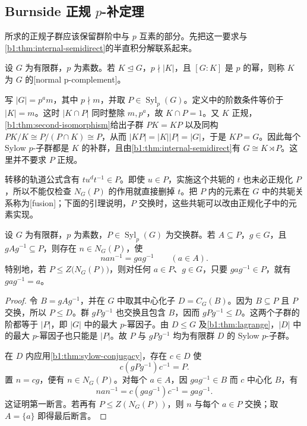 \subsection{Burnside 正规 \texorpdfstring{\(p\)}{p}-补定理}
\label{b1:subsec:C05:02}

所求的正规子群应该保留群阶中与 \(p\) 互素的部分。先把这一要求与\cref{b1:thm:internal-semidirect}的半直积分解联系起来。

\begin{definition}\label{b1:def:normal-p-complement}
	设 \(G\) 为有限群，\(p\) 为素数。若 \(K\trianglelefteq G\)，\(p\nmid|K|\)，且 \([G:K]\) 是 \(p\) 的幂，则称 \(K\) 为 \(G\) 的[normal p-complement]。
\end{definition}

写 \(|G|=p^am\)，其中 \(p\nmid m\)，并取 \(P\in\operatorname{Syl}_p(G)\)。定义中的阶数条件等价于 \(|K|=m\)。这时 \(|K\cap P|\) 同时整除 \(m,p^a\)，故 \(K\cap P=1\)。又 \(K\) 正规，\cref{b1:thm:second-isomorphism}给出子群 \(PK=KP\) 以及同构 \(PK/K\cong P/(P\cap K)\cong P\)，从而 \(|KP|=|K||P|=|G|\)，于是 \(KP=G\)。因此每个 Sylow \(p\)-子群都是 \(K\) 的补群，且由\cref{b1:thm:internal-semidirect}有 \(G\cong K\rtimes P\)。这里并不要求 \(P\) 正规。

\ProseParagraphBreak
转移的轨道公式含有 \(t u^dt^{-1}\in P\)。即使 \(u\in P\)，实施这个共轭的 \(t\) 也未必正规化 \(P\)，所以不能仅检查 \(N_G(P)\) 的作用就直接删掉 \(t\)。把 \(P\) 内的元素在 \(G\) 中的共轭关系称为[fusion]；下面的引理说明，\(P\) 交换时，这些共轭可以改由正规化子中的元素实现。

\begin{lemma}\label{b1:lem:abelian-sylow-fusion}
	设 \(G\) 为有限群，\(p\) 为素数，\(P\in\operatorname{Syl}_p(G)\) 为交换群。若 \(A\subseteq P\)，\(g\in G\)，且 \(gAg^{-1}\subseteq P\)，则存在 \(n\in N_G(P)\)，使
	\[
		nan^{-1}=gag^{-1}\qquad(a\in A).
	\]
	特别地，若 \(P\leq Z\bigl(N_G(P)\bigr)\)，则对任何 \(a\in P\)、\(g\in G\)，只要 \(gag^{-1}\in P\)，就有 \(gag^{-1}=a\)。
\end{lemma}

\begin{proof}
	令 \(B=gAg^{-1}\)，并在 \(G\) 中取其中心化子 \(D=C_G(B)\)。因为 \(B\subseteq P\) 且 \(P\) 交换，所以 \(P\leq D\)。群 \(gPg^{-1}\) 也交换且包含 \(B\)，因而 \(gPg^{-1}\leq D\)。这两个子群的阶都等于 \(|P|\)，即 \(|G|\) 中的最大 \(p\)-幂因子。由 \(D\leq G\) 及\cref{b1:thm:lagrange}，\(|D|\) 中的最大 \(p\)-幂因子也只能是 \(|P|\)。故 \(P\) 与 \(gPg^{-1}\) 均为有限群 \(D\) 的 Sylow \(p\)-子群。

	在 \(D\) 内应用\cref{b1:thm:sylow-conjugacy}，存在 \(c\in D\) 使
	\[
		c(gPg^{-1})c^{-1}=P.
	\]
	置 \(n=cg\)，便有 \(n\in N_G(P)\)。对每个 \(a\in A\)，因 \(gag^{-1}\in B\) 而 \(c\) 中心化 \(B\)，有
	\[
		nan^{-1}=c(gag^{-1})c^{-1}=gag^{-1}.
	\]
	这证明第一断言。若再有 \(P\leq Z(N_G(P))\)，则 \(n\) 与每个 \(a\in P\) 交换；取 \(A=\{a\}\) 即得最后断言。
\end{proof}

